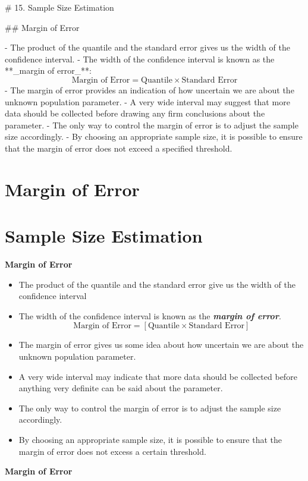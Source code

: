 # 15. Sample Size Estimation

## Margin of Error

- The product of the quantile and the standard error gives us the width of the confidence interval.
- The width of the confidence interval is known as the **_margin of error_**:  
  \[
  \text{Margin of Error} = \text{Quantile} \times \text{Standard Error}
  \]
- The margin of error provides an indication of how uncertain we are about the unknown population parameter.
- A very wide interval may suggest that more data should be collected before drawing any firm conclusions about the parameter.
- The only way to control the margin of error is to adjust the sample size accordingly.
- By choosing an appropriate sample size, it is possible to ensure that the margin of error does not exceed a specified threshold.

\section{Margin of Error}


\section{Sample Size Estimation}

\textbf{Margin of Error}

\begin{itemize}
\item The product of the quantile and the standard error give us the width of the confidence interval
\item The width of the confidence interval is known as the \textbf{\emph{margin of error}}.  \[ \mbox{Margin of Error}  = \left[ \mbox{Quantile} \times \mbox{Standard Error} \right] \]
\item The margin of error gives us some idea about how uncertain we are about the unknown population parameter. \item A very wide interval may indicate that more data should be collected before anything very definite can be said about the parameter.
\item The only way to control the margin of error is to adjust the sample size accordingly.
\item By choosing an appropriate sample size, it is possible to ensure that the margin of error does not excess a certain threshold.
\end{itemize}
\newpage

\textbf{Margin of Error}

